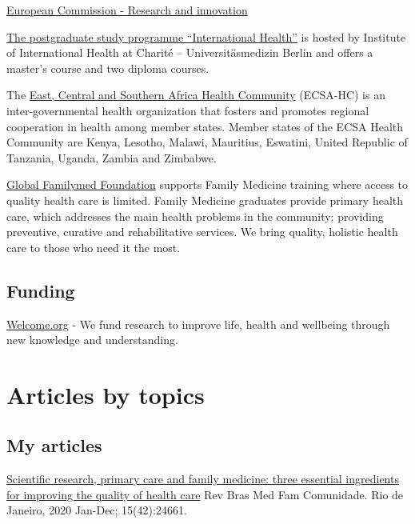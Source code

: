 \documentclass[
  letterpaper,
  DIV=11,
  numbers=noendperiod]{scrreprt}
\begin{document}
\href{https://research-and-innovation.ec.europa.eu/funding/funding-opportunities/funding-programmes-and-open-calls/horizon-europe/cluster-1-health_en}{European
Commission - Research and innovation}

\href{https://internationalhealth.charite.de/en/}{The postgraduate study
programme ``International Health''} is hosted by Institute of
International Health at Charité -- Universitäsmedizin Berlin and offers
a master's course and two diploma courses.

The \href{https://ecsahc.org/ecsa-hc-at-a-glance/}{East, Central and
Southern Africa Health Community} (ECSA-HC) is an inter-governmental
health organization that fosters and promotes regional cooperation in
health among member states. Member states of the ECSA Health Community
are Kenya, Lesotho, Malawi, Mauritius, Eswatini, United Republic of
Tanzania, Uganda, Zambia and Zimbabwe.

\href{https://www.globalfamilymed.org/}{Global Familymed Foundation}
supports Family Medicine training where access to quality health care is
limited. Family Medicine graduates provide primary health care, which
addresses the main health problems in the community; providing
preventive, curative and rehabilitative services. We bring quality,
holistic health care to those who need it the most.

\section{Funding}\label{funding}

\href{https://wellcome.org/research-funding}{Welcome.org} - We fund
research to improve life, health and wellbeing through new knowledge and
understanding.


\chapter{Articles by topics}\label{articles-by-topics}

\section{My articles}\label{my-articles}

\href{https://rbmfc.org.br/rbmfc/article/view/2466/1565}{Scientific
research, primary care and family medicine: three essential ingredients
for improving the quality of health care} Rev Bras Med Fam Comunidade.
Rio de Janeiro, 2020 Jan-Dec; 15(42):24661.
\end{document}
